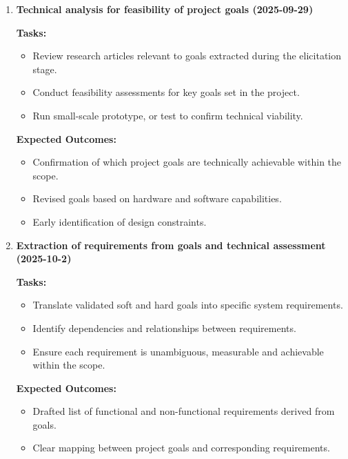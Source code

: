 \documentclass[12pt]{article}
\theoremstyle{definition}
\begin{document}
\begin{enumerate}
  \vspace{0.8em}

  \item \textbf{Technical analysis for feasibility of project goals 
  (2025-09-29)}  

  \textbf{Tasks:}
  \begin{itemize}
      \item Review research articles relevant to goals extracted during the 
      elicitation stage. 
      \item Conduct feasibility assessments for key goals set in the project. 
      \item Run small-scale prototype, or test to confirm technical viability. 
  \end{itemize}

  \textbf{Expected Outcomes:}
  \begin{itemize}
      \item Confirmation of which project goals are technically achievable 
      within the scope.
      \item Revised goals based on hardware and software capabilities. 
      \item Early identification of design constraints. 
  \end{itemize}

  \vspace{0.8em}

  \item \textbf{Extraction of requirements from goals and technical assessment 
  (2025-10-2)}

  \textbf{Tasks:}
  \begin{itemize}
      \item Translate validated soft and hard goals into specific system 
      requirements. 
      \item Identify dependencies and relationships between requirements. 
      \item Ensure each requirement is unambiguous, measurable and achievable 
      within the scope. 
  \end{itemize}

  \textbf{Expected Outcomes:}
  \begin{itemize}
      \item Drafted list of functional and non-functional requirements derived 
      from goals. 
      \item Clear mapping between project goals and corresponding requirements. 
  \end{itemize}


\end{enumerate}
\end{document}
